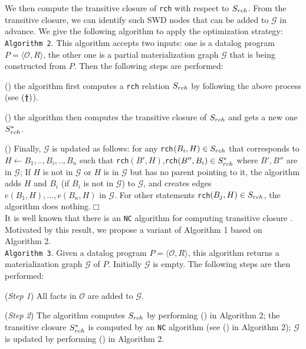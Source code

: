 \documentclass{article}
\begin{document}
We then compute the transitive closure of \texttt{rch} with respect to $S_{\tiny rch}$. From the transitive closure, we can identify such SWD nodes that can be added to $\mathcal{G}$ in advance. We give the following algorithm to apply the optimization strategy:\\

\noindent\texttt{Algorithm 2}. This algorithm accepts two inputs: one is a datalog program $P=\langle\mathcal{O}, R\rangle$, the other one is a partial materialization graph $\mathcal{G}$ that is being constructed from $P$. Then the following steps are performed:

(\textbf{}) the algorithm first computes a \texttt{rch} relation $S_{\tiny rch}$ by following the above process (see $(\textbf{\dag})$).

(\textbf{}) the algorithm then computes the transitive closure of $S_{\tiny rch}$ and gets a new one $S^*_{\tiny rch}$.

(\textbf{}) Finally, $\mathcal{G}$ is updated as follows: for any \texttt{rch}$(B_i,H)\in S_{\tiny rch}$ that corresponds to $H\leftarrow B_1,..,B_i,..,B_n$
such that \texttt{rch}$(B',H)$,\texttt{rch}$(B'',B_i)\in S^*_{\tiny rch}$ where $B',B''$ are in $\mathcal{G}$; If $H$ is not in $\mathcal{G}$ or $H$ is in $\mathcal{G}$ but has no parent pointing to it, the algorithm adds $H$ and $B_i$ (if $B_i$ is not in $\mathcal{G}$) to $\mathcal{G}$, and creates edges $e(B_1, H),...,e(B_n, H)$ in $\mathcal{G}$. For other statements \texttt{rch}$(B_j,H)\in S_{\tiny rch}$, the algorithm does nothing.\hfill$\Box$\\

It is well known that there is an \texttt{NC} algorithm for computing transitive closure \cite{DBLP:conf/cie/Allender07}.
Motivated by this result, we propose a variant of Algorithm 1 based on Algorithm 2.\\

\noindent\texttt{Algorithm 3}. Given a datalog program $P=\langle\mathcal{O}, R\rangle$, this algorithm
returns a materialization graph $\mathcal{G}$ of $P$. Initially $\mathcal{G}$ is empty. The following steps are then performed:

(\emph{Step 1}) All facts in $\mathcal{O}$ are added to $\mathcal{G}$.

(\emph{Step 2}) The algorithm computes $S_{\tiny rch}$ by performing (\textbf{}) in Algorithm 2; the transitive closure $S^*_{\tiny rch}$ is computed by an \texttt{NC} algorithm (see (\textbf{}) in Algorithm 2); $\mathcal{G}$ is updated by performing (\textbf{}) in Algorithm 2.
\end{document}
